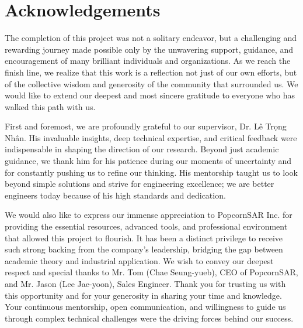\chapter*{Acknowledgements}


The completion of this project was not a solitary endeavor, but a challenging and rewarding journey made possible only by the unwavering support, guidance, and encouragement of many brilliant individuals and organizations. As we reach the finish line, we realize that this work is a reflection not just of our own efforts, but of the collective wisdom and generosity of the community that surrounded us. We would like to extend our deepest and most sincere gratitude to everyone who has walked this path with us.

First and foremost, we are profoundly grateful to our supervisor, Dr. Lê Trọng Nhân. His invaluable insights, deep technical expertise, and critical feedback were indispensable in shaping the direction of our research. Beyond just academic guidance, we thank him for his patience during our moments of uncertainty and for constantly pushing us to refine our thinking. His mentorship taught us to look beyond simple solutions and strive for engineering excellence; we are better engineers today because of his high standards and dedication.

We would also like to express our immense appreciation to PopcornSAR Inc. for providing the essential resources, advanced tools, and professional environment that allowed this project to flourish. It has been a distinct privilege to receive such strong backing from the company’s leadership, bridging the gap between academic theory and industrial application. We wish to convey our deepest respect and special thanks to Mr. Tom (Chae Seung-yueb), CEO of PopcornSAR, and Mr. Jason (Lee Jae-yoon), Sales Engineer. Thank you for trusting us with this opportunity and for your generosity in sharing your time and knowledge. Your continuous mentorship, open communication, and willingness to guide us through complex technical challenges were the driving forces behind our success.


